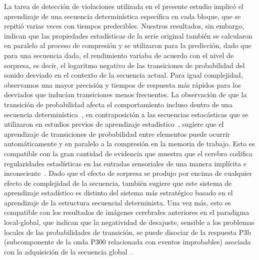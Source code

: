 La tarea de detección de violaciones utilizada en el presente estudio implicó el aprendizaje de una secuencia determinística específica en cada bloque, que se repitió varias veces con tiempos predecibles. Nuestros resultados, sin embargo, indican que las propiedades estadísticas de la serie original también se calcularon en paralelo al proceso de compresión y se utilizaron para la predicción, dado que para una secuencia dada, el rendimiento variaba de acuerdo con el nivel de sorpresa, es decir, el logaritmo negativo de las transiciones de probabilidad del sonido desviado en el contexto de la secuencia actual. Para igual complejidad, observamos una mayor precisión y tiempos de respuesta más rápidos para los desviados que inducían transiciones menos frecuentes. La observación de que la transición de probabilidad afecta el comportamiento incluso dentro de una secuencia determinística~\cite{f80}, en contraposición a las secuencias estocásticas que se utilizaron en estudios previos de aprendizaje estadístico~\cite{f18,f19,f20,f74,f75,f122}, sugiere que el aprendizaje de transiciones de probabilidad entre elementos puede ocurrir automáticamente y en paralelo a la compresión en la memoria de trabajo. Esto es compatible con la gran cantidad de evidencia que muestra que el cerebro codifica regularidades estadísticas en las entradas sensoriales de una manera implícita e inconsciente~\cite{f73,f123,f124,f125,f126}. Dado que el efecto de sorpresa se produjo por encima de cualquier efecto de complejidad de la secuencia, también sugiere que este sistema de aprendizaje estadístico es distinto del sistema más estratégico basado en el aprendizaje de la estructura secuencial determinista. Una vez más, esto es compatible con los resultados de imágenes cerebrales anteriores en el paradigma local-global, que indican que la negatividad de desajuste, sensible a los problemas locales de las probabilidades de transición, se puede disociar de la respuesta P3b (subcomponente de la onda P300 relacionada con eventos improbables) asociada con la adquisición de la secuencia global~\cite{f67,f68,f72}.


